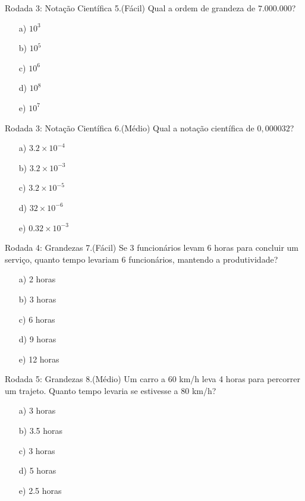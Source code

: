 \documentclass{beamer}
\begin{document}
\begin{frame}{Rodada 3: Notação Científica}
    5.(Fácil) Qual a ordem de grandeza de $7.000.000$?
    \begin{itemize}
        \item[a)] $10^3$
        \item[b)] $10^5$
        \item[c)] $10^6$
        \item[d)] $10^8$
        \item[e)] \alert<2->{$10^7$}
    \end{itemize}
\end{frame}


\begin{frame}{Rodada 3: Notação Científica}
    6.(Médio) Qual a notação científica de $0,000032$?
    \begin{itemize}
        \item[a)] $3.2 \times 10^{-4}$
        \item[b)] $3.2 \times 10^{-3}$
        \item[c)] \alert<2->{$3.2 \times 10^{-5}$}
        \item[d)] $32 \times 10^{-6}$
        \item[e)] $0.32 \times 10^{-3}$
    \end{itemize}
\end{frame}
\begin{frame}{Rodada 4: Grandezas }
    7.(Fácil) Se 3 funcionários levam 6 horas para concluir um serviço, quanto tempo levariam 6 funcionários, mantendo a produtividade?
    \begin{itemize}
        \item[a)] 2 horas
        \item[b)] \alert<2>{3 horas}
        \item[c)] 6 horas
        \item[d)] 9 horas
        \item[e)] 12 horas
    \end{itemize}
\end{frame}

\begin{frame}{Rodada 5: Grandezas }
    8.(Médio) Um carro a 60 km/h leva 4 horas para percorrer um trajeto. Quanto tempo levaria se estivesse a 80 km/h?
    \begin{itemize}
        \item[a)] 3 horas
        \item[b)] 3.5 horas
        \item[c)] \alert<2>{3 horas}
        \item[d)] 5 horas
        \item[e)] 2.5 horas
    \end{itemize}
\end{frame}
\end{document}
